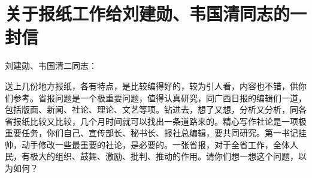 \section[关于报纸工作给刘建勋、韦国清同志的一封信（一九五八年一月十二日）]{关于报纸工作给刘建勋、韦国清同志的一封信}


刘建勋、韦国清二同志：

送上几份地方报纸，各有特点，是比较编得好的，较为引人看，内容也不错，供你们参考。省报问题是一个极重要问题，值得认真研究，同广西日报的编辑们一道，包括版面、新闻、社论、理论、文艺等项。钻进去，想了又想，分析又分析，同各省报纸比较又比较，几个月时间就可以找出一条道路来的。精心写作社论是一项极重要任务，你们自己、宣传部长、秘书长、报社总编辑，要共同研究。第一书记挂帅，动手修改一些最重要的社论，是必要的。一张省报，对于全省工作，全体人民，有极大的组织、鼓舞、激励、批判、推动的作用。请你们想一想这个问题，以为如何？


